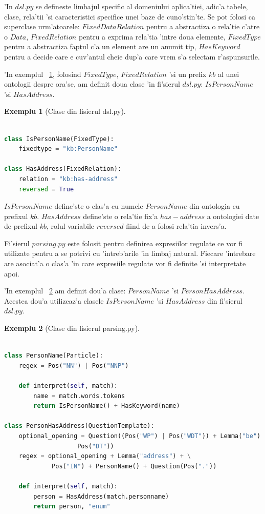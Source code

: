 \documentclass[12pt,a4paper,twoside]{report}
\newtheorem{example}{Exemplu}
\begin{document}
'In $dsl.py$ se defineste limbajul specific al domeniului aplica'tiei, adic'a tabele, clase, rela'tii 'si caracteristici specifice unei baze de cuno'stin'te. Se pot folosi ca superclase urm'atoarele: $FixedDataRelation$ pentru a abstractiza o rela'tie c'atre o $Data$, $FixedRelation$ pentru a exprima rela'tia 'intre doua elemente, $FixedType$ pentru a abstractiza faptul c'a un element are un anumit tip, $HasKeyword$ pentru a decide care e cuv'antul cheie dup'a care vrem s'a selectam r'aspunsurile. 

'In exemplul ~\ref{ex:dsl}, folosind $FixedType$, $FixedRelation$ 'si un prefix $kb$ al unei ontologii despre ora'se, am definit doua clase 'in fi'sierul $dsl.py$: $IsPersonName$ 'si $HasAddress$.
\begin{example}[Clase din fisierul dsl.py]
\begin{lstlisting}[basicstyle=\footnotesize, language = Python]

class IsPersonName(FixedType):
    fixedtype = "kb:PersonName"
    
class HasAddress(FixedRelation):
    relation = "kb:has-address"
    reversed = True
\end{lstlisting}
\label{ex:dsl}
\end{example}

$IsPersonName$ define'ste o clas'a cu numele $PersonName$ din ontologia cu prefixul $kb$. $HasAddress$ define'ste o rela'tie fix'a $has-address$ a ontologiei date de prefixul $kb$, rolul variabile $reversed$ fiind de a folosi rela'tia invers'a.

Fi'sierul $parsing.py$ este folosit pentru definirea expresiilor regulate ce vor fi utilizate pentru a se potrivi cu 'intreb'arile 'in limbaj natural. Fiecare 'intrebare are asociat'a o clas'a 'in care expresiile regulate vor fi definite 'si interpretate apoi.

'In exemplul ~\ref{ex:parsing} am definit dou'a clase: $PersonName$ 'si $PersonHasAddress$. Acestea dou'a utilizeaz'a clasele $IsPersonName$ 'si $HasAddress$ din fi'sierul $dsl.py$.
\begin{example}[Clase din fisierul parsing.py]
\begin{lstlisting}[basicstyle=\footnotesize, language = Python]

class PersonName(Particle):
    regex = Pos("NN") | Pos("NNP")

    def interpret(self, match):
        name = match.words.tokens
        return IsPersonName() + HasKeyword(name)
    
class PersonHasAddress(QuestionTemplate):
    optional_opening = Question((Pos("WP") | Pos("WDT")) + Lemma("be") +
                    Pos("DT"))
    regex = optional_opening + Lemma("address") + \
             Pos("IN") + PersonName() + Question(Pos("."))

    def interpret(self, match):
        person = HasAddress(match.personname)
        return person, "enum"

\end{lstlisting}
\label{ex:parsing}
\end{example}
\end{document}
